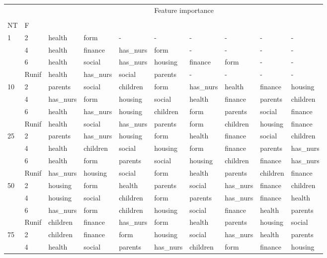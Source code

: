 \begin{table}[htbp]
\centering
\label{nursery-features}
\begin{tabular}{llllllllll}
\toprule
 &  & \multicolumn{8}{c}{Feature importance} \\
 &  & #1 & #2 & #3 & #4 & #5 & #6 & #7 & #8 \\
NT & F &  &  &  &  &  &  &  &  \\
\midrule
\multirow[c]{4}{*}{1} & 2 & health & form & - & - & - & - & - & - \\
 & 4 & health & finance & has_nurs & form & - & - & - & - \\
 & 6 & health & social & has_nurs & housing & finance & form & - & - \\
 & Runif & health & has_nurs & social & parents & - & - & - & - \\
\multirow[c]{4}{*}{10} & 2 & parents & social & children & form & has_nurs & health & finance & housing \\
 & 4 & has_nurs & form & housing & social & health & finance & parents & children \\
 & 6 & health & has_nurs & housing & children & form & parents & social & finance \\
 & Runif & health & social & has_nurs & parents & form & children & housing & finance \\
\multirow[c]{4}{*}{25} & 2 & parents & has_nurs & housing & form & health & finance & social & children \\
 & 4 & health & children & social & housing & form & finance & parents & has_nurs \\
 & 6 & health & form & parents & social & housing & children & finance & has_nurs \\
 & Runif & has_nurs & housing & social & form & health & parents & children & finance \\
\multirow[c]{4}{*}{50} & 2 & housing & form & health & parents & social & has_nurs & finance & children \\
 & 4 & housing & social & children & form & parents & has_nurs & finance & health \\
 & 6 & has_nurs & form & children & housing & social & finance & health & parents \\
 & Runif & children & finance & has_nurs & form & health & parents & housing & social \\
\multirow[c]{4}{*}{75} & 2 & children & finance & form & housing & social & has_nurs & health & parents \\
 & 4 & health & social & parents & has_nurs & children & form & finance & housing \\

\end{tabular}
\end{table}
